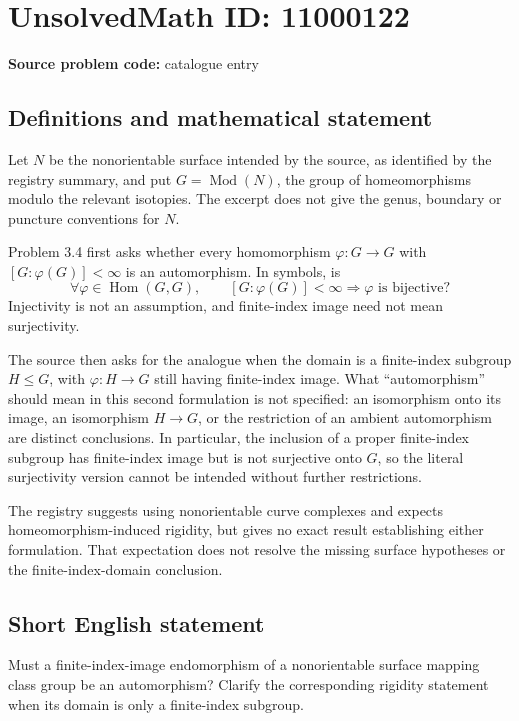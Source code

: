 \documentclass[11pt]{article}
\begin{document}
\section*{UnsolvedMath ID: 11000122}
\textbf{Source problem code:} catalogue entry
\subsection{Definitions and mathematical statement}
Let $N$ be the nonorientable surface intended by the source, as identified by the registry summary, and put $G=\operatorname{Mod}(N)$, the group of homeomorphisms modulo the relevant isotopies. The excerpt does not give the genus, boundary or puncture conventions for $N$.

Problem 3.4 first asks whether every homomorphism $\varphi:G\to G$ with $[G:\varphi(G)]<\infty$ is an automorphism. In symbols, is
\[
 \forall\varphi\in\operatorname{Hom}(G,G),\qquad
 [G:\varphi(G)]<\infty\Longrightarrow
 \varphi\text{ is bijective}?
\]
Injectivity is not an assumption, and finite-index image need not mean surjectivity.

The source then asks for the analogue when the domain is a finite-index subgroup $H\leq G$, with $\varphi:H\to G$ still having finite-index image. What ``automorphism'' should mean in this second formulation is not specified: an isomorphism onto its image, an isomorphism $H\to G$, or the restriction of an ambient automorphism are distinct conclusions. In particular, the inclusion of a proper finite-index subgroup has finite-index image but is not surjective onto $G$, so the literal surjectivity version cannot be intended without further restrictions.

The registry suggests using nonorientable curve complexes and expects homeomorphism-induced rigidity, but gives no exact result establishing either formulation. That expectation does not resolve the missing surface hypotheses or the finite-index-domain conclusion.
\subsection{Short English statement}
Must a finite-index-image endomorphism of a nonorientable surface mapping class group be an automorphism? Clarify the corresponding rigidity statement when its domain is only a finite-index subgroup.
\end{document}
